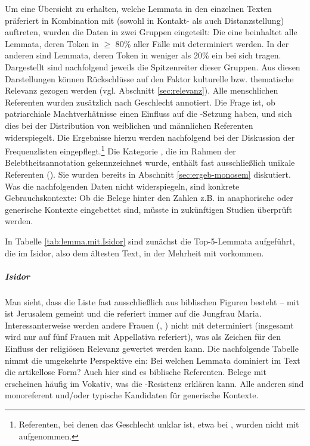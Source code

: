 Um eine Übersicht zu erhalten, welche Lemmata in den einzelnen Texten präferiert in Kombination mit  (sowohl in Kontakt- als auch Distanzstellung) auftreten, wurden die Daten in zwei Gruppen eingeteilt: Die eine beinhaltet alle Lemmata, deren Token in $\geq$ 80\% aller Fälle  mit  determiniert werden. In der anderen sind Lemmata, deren Token in weniger als 20\%  ein  bei sich tragen. Dargestellt sind nachfolgend jeweils die Spitzenreiter dieser Gruppen. Aus diesen Darstellungen können Rückschlüsse auf den Faktor kulturelle bzw. thematische Relevanz gezogen werden (vgl. Abschnitt \ref{sec:relevanz}). Alle menschlichen Referenten wurden zusätzlich nach Geschlecht annotiert. Die Frage ist, ob patriarchiale Machtverhätnisse  einen Einfluss auf die -Setzung haben, und sich dies bei der Distribution von weiblichen und männlichen Referenten widerspiegelt. Die Ergebnisse hierzu werden nachfolgend bei der Diskussion der Frequenzlisten eingepflegt.\footnote{Referenten, bei denen das Geschlecht unklar ist, etwa bei , wurden nicht mit aufgenommen.} Die Kategorie , die im Rahmen der Belebtheitsannotation gekennzeichnet wurde, enthält fast ausschließlich unikale Referenten (). Sie wurden bereits in Abschnitt \ref{sec:ergeb-monosem} diskutiert. Was die nachfolgenden Daten nicht widerspiegeln, sind konkrete Gebrauchskontexte: Ob die Belege hinter den Zahlen z.B. in anaphorische oder generische Kontexte eingebettet sind, müsste in zukünftigen Studien überprüft werden. 

In Tabelle \ref {tab:lemma.mit.Isidor} sind zunächst die Top-5-Lemmata aufgeführt, die im Isidor, also dem ältesten Text, in der Mehrheit mit  vorkommen. 

\subparagraph{Isidor}

Man sieht, dass die Liste fast ausschließlich aus biblischen Figuren besteht -- mit  ist Jerusalem gemeint und die  referiert immer auf die Jungfrau Maria. Interessanterweise werden andere Frauen (, ) nicht mit  determiniert (insgesamt wird nur auf fünf Frauen mit Appellativa referiert), was als Zeichen für den Einfluss der religiösen Relevanz gewertet werden kann. 
Die nachfolgende Tabelle nimmt die umgekehrte Perspektive ein: Bei welchen Lemmata dominiert im Text die artikellose Form? Auch hier sind es biblische Referenten. Belege mit  erscheinen häufig im Vokativ, was die -Resistenz erklären kann. Alle anderen sind monoreferent und/oder typische Kandidaten für generische Kontexte.

